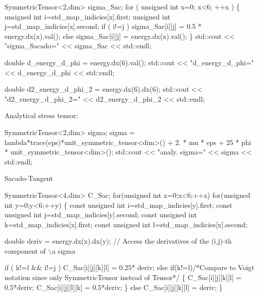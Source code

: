 \begin{DoxyCode}
SymmetricTensor<2,dim> sigma\_Sac;
\textcolor{keywordflow}{for} ( \textcolor{keywordtype}{unsigned} \textcolor{keywordtype}{int} x=0; x<6; ++x )
\{
   \textcolor{keywordtype}{unsigned} \textcolor{keywordtype}{int} i=std\_map\_indicies[x].first;
   \textcolor{keywordtype}{unsigned} \textcolor{keywordtype}{int} j=std\_map\_indicies[x].second;
   \textcolor{keywordflow}{if} ( i!=j )
       sigma\_Sac[i][j] = 0.5 * energy.dx(x).val();
   \textcolor{keywordflow}{else}
       sigma\_Sac[i][j] = energy.dx(x).val();
\}
std::cout << \textcolor{stringliteral}{"sigma\_Sacado="} << sigma\_Sac << std::endl;

\textcolor{keywordtype}{double} d\_energy\_d\_phi = energy.dx(6).val();
std::cout << \textcolor{stringliteral}{"d\_energy\_d\_phi="} << d\_energy\_d\_phi << std::endl;

\textcolor{keywordtype}{double} d2\_energy\_d\_phi\_2 = energy.dx(6).dx(6);
std::cout << \textcolor{stringliteral}{"d2\_energy\_d\_phi\_2="} << d2\_energy\_d\_phi\_2 << std::endl;
\end{DoxyCode}
 Analytical stress tensor\+: 
\begin{DoxyCode}
SymmetricTensor<2,dim> sigma;
sigma = lambda*trace(eps)*unit\_symmetric\_tensor<dim>() + 2. * mu * eps + 25 * phi * 
      unit\_symmetric\_tensor<dim>();
std::cout << \textcolor{stringliteral}{"analy. sigma="} << sigma << std::endl;
\end{DoxyCode}
 Sacado-\/\+Tangent 
\begin{DoxyCode}
SymmetricTensor<4,dim> C\_Sac;
\textcolor{keywordflow}{for}(\textcolor{keywordtype}{unsigned} \textcolor{keywordtype}{int} x=0;x<6;++x)
   \textcolor{keywordflow}{for}(\textcolor{keywordtype}{unsigned} \textcolor{keywordtype}{int} y=0;y<6;++y)
   \{
       \textcolor{keyword}{const} \textcolor{keywordtype}{unsigned} \textcolor{keywordtype}{int} i=std\_map\_indicies[y].first;
       \textcolor{keyword}{const} \textcolor{keywordtype}{unsigned} \textcolor{keywordtype}{int} j=std\_map\_indicies[y].second;
       \textcolor{keyword}{const} \textcolor{keywordtype}{unsigned} \textcolor{keywordtype}{int} k=std\_map\_indicies[x].first;
       \textcolor{keyword}{const} \textcolor{keywordtype}{unsigned} \textcolor{keywordtype}{int} l=std\_map\_indicies[x].second;

       \textcolor{keywordtype}{double} deriv = energy.dx(x).dx(y); \textcolor{comment}{// Access the derivatives of the (i,j)-th component of \(\backslash\)a sigma}

       \textcolor{keywordflow}{if} ( k!=l && i!=j )
           C\_Sac[i][j][k][l] = 0.25* deriv;
       \textcolor{keywordflow}{else} \textcolor{keywordflow}{if}(k!=l)\textcolor{comment}{/*Compare to Voigt notation since only SymmetricTensor instead of Tensor*/}
       \{
           C\_Sac[i][j][k][l] = 0.5*deriv;
           C\_Sac[i][j][l][k] = 0.5*deriv;
       \}
       \textcolor{keywordflow}{else}
           C\_Sac[i][j][k][l] = deriv;
   \}
\end{DoxyCode}
